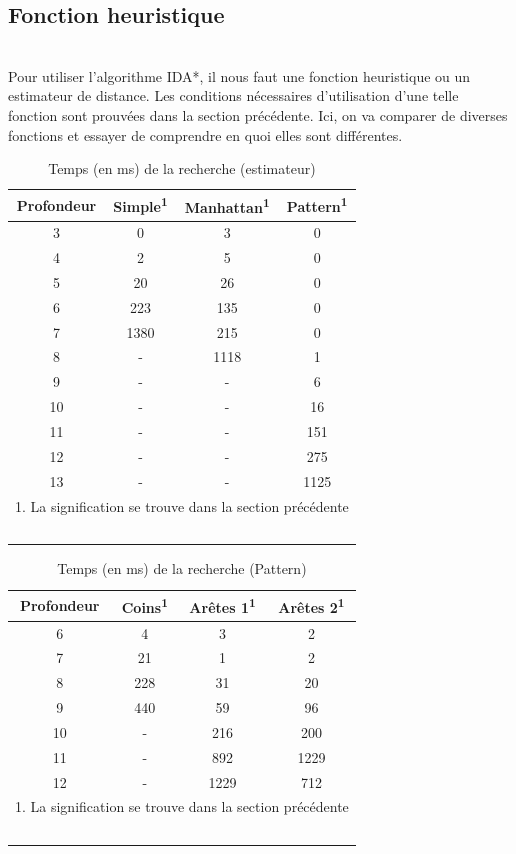 \documentclass[fleqn,10pt,french]{SelfArx} %
\begin{document}
\subsection{Fonction heuristique}

~\\\indent
Pour utiliser l’algorithme IDA*, il nous faut une fonction heuristique ou un estimateur de distance. Les conditions nécessaires d’utilisation d’une telle fonction sont prouvées dans la section précédente. Ici, on va comparer de diverses fonctions et essayer de comprendre en quoi elles sont différentes.

\begin{table}[htbp]
\centering
\begin{tabular}{cccc}
\hline
\rowcolor{blue!20} \rule{0pt}{12pt} \textbf{Profondeur} & \textbf{Simple\textsuperscript{1} } & \textbf{Manhattan}\textsuperscript{1} & \textbf{Pattern\textsuperscript{1}}\\
\hline
3 & 0 & 3 & 0 \\
4 & 2 & 5 & 0 \\
5 & 20 & 26 & 0 \\
6 & 223 & 135 & 0  \\
7 & 1380 & 215 & 0 \\
8 & - & 1118 & 1 \\
9 & - & - & 6 \\
10 & - & - & 16 \\
11 & - & - & 151 \\
12 & - & - & 275 \\
13 & - & - & 1125 \\
\hline
\multicolumn{4}{l}{\small{1. La signification se trouve dans la section précédente}} \\
\hline
~\\
\end{tabular}
\caption{Temps (en ms) de la recherche (estimateur)}
\end{table}

\begin{table}[htbp]
\centering
\begin{tabular}{cccc}
\hline
\rowcolor{blue!20} \rule{0pt}{12pt} \textbf{Profondeur} & \textbf{Coins\textsuperscript{1} } & \textbf{Arêtes 1}\textsuperscript{1} & \textbf{Arêtes 2\textsuperscript{1}}\\
\hline
6 & 4 & 3 & 2 \\
7 & 21 & 1 & 2 \\
8 & 228 & 31 & 20  \\
9 & 440 & 59 & 96 \\
10 & - & 216 & 200 \\
11 & - & 892 & 1229 \\
12 & - & 1229 & 712 \\
\hline
\multicolumn{4}{l}{\small{1. La signification se trouve dans la section précédente}} \\
\hline
~\\
\end{tabular}
\caption{Temps (en ms) de la recherche (Pattern)}
\end{table}
\end{document}
